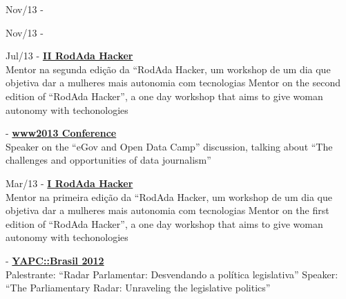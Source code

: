 \documentclass[]{friggeri-cv}
\begin{document}
{\footnotesize{Nov/13}}  - \href{https://knightcenter.utexas.edu/pt-br/blog/00-14390-inscricoes-abertas-para-primeiro-curso-da-anj-com-o-centro-knight-introducao-ao-jornal}{\textbf{}}\\

{\footnotesize{Nov/13}} - \href{http://2.encontro.dados.gov.br/encontro.html}{\textbf{}}\\

{\footnotesize{Jul/13}} - \href{http://rodadahacker.com/}{\textbf{II RodAda Hacker}}\\
%
{Mentor na segunda edição da ``RodAda Hacker, um workshop de um dia que objetiva dar a mulheres mais autonomia com tecnologias}%
{Mentor on the second edition of ``RodAda Hacker'', a one day workshop that aims to give woman autonomy with techonologies}

{\footnotesize{}} - \href{http://www2013.org/}{\textbf{www2013 Conference}}\\
%
{Speaker on the ``eGov and Open Data Camp'' discussion, talking about ``The challenges and opportunities of data journalism''}

{\footnotesize{Mar/13}} - \href{http://rodadahacker.com/}{\textbf{I RodAda Hacker}}\\
%
{Mentor na primeira edição da ``RodAda Hacker, um workshop de um dia que objetiva dar a mulheres mais autonomia com tecnologias}%
{Mentor on the first edition of ``RodAda Hacker'', a one day workshop that aims to give woman autonomy with techonologies}

{\footnotesize{}} - \href{http://yapcbrasil.org.br/2012/talk/110}{\textbf{YAPC::Brasil 2012}}\\
%
{Palestrante: ``Radar Parlamentar: Desvendando a política legislativa''}%
{Speaker: ``The Parliamentary Radar: Unraveling the legislative politics''}
\end{document}
